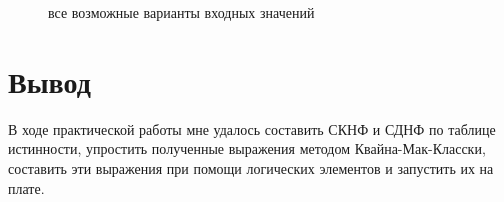 \documentclass[a4paper]{article}
\begin{document}
\begin{figure}[H]
    \caption{все возможные варианты входных значений}
  \end{figure}

  \section*{Вывод}

  В ходе практической работы мне удалось составить СКНФ и СДНФ по таблице истинности, упростить
  полученные выражения методом Квайна-Мак-Класски, составить эти выражения при помощи логических
  элементов и запустить их на плате.
\end{document}
